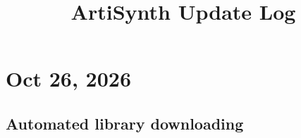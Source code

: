 \documentclass{article}
\title{ArtiSynth Update Log}
\date{}
\def\mech{artisynth.core.mechmodels}
\def\mgeo{maspack.geometry}
\begin{document}
\def\mech{artisynth.core.mechmodels}
\def\renderables{artisynth.core.renderables}
\def\mbase{artisynth.core.modelbase}
\def\probes{artisynth.core.probes}
\def\gui{artisynth.core.gui}
\def\fem{artisynth.core.femmodels}
\def\mats{artisynth.core.materials}
\def\fields{artisynth.core.fields}
\def\inverse{artisynth.core.inverse}
\def\osim{artisynth.core.opensim}
\def\mgeo{maspack.geometry}

\iflatexml
\else
\maketitle
\fi

%
%
%




\section*{Oct 26, 2026}

\subsection{Automated library downloading}
\end{document}
